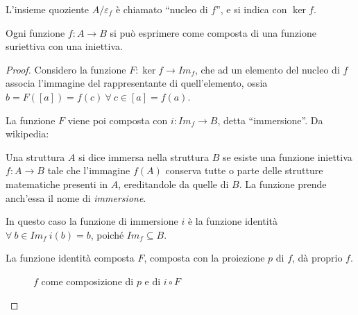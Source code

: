 \begin{defn}
L'insieme quoziente $A / \varepsilon_f$ \`e chiamato ``nucleo di $f$'', e si indica con $\ker f$.
\end{defn}

\begin{prop}
Ogni funzione $f : A \to B$ si pu\`o esprimere come composta di una funzione suriettiva con una iniettiva.
\end{prop}

\begin{proof}
Considero la funzione $F : \ker f \to Im_f$, che ad un elemento del nucleo di $f$ associa l'immagine del rappresentante di quell'elemento, ossia $b = F([a]) = f(c) \ \forall \ c \in [a] = f(a)$.

La funzione $F$ viene poi composta con $i : Im_f \to B $, detta ``immersione''. Da wikipedia:
\begin{defn}[Immersione]
Una struttura $A$  si dice immersa nella struttura $B$ se esiste una funzione iniettiva $f: A \to B$ tale che l'immagine $f(A)$ conserva tutte o parte delle strutture matematiche presenti in $A$, ereditandole da quelle di $B$. La funzione prende anch'essa il nome di \textit{immersione}.
\end{defn} 
In questo caso la funzione di immersione $i$ \`e la funzione identit\`a $ \forall \ b \in Im_f \ i(b) = b$, poich\'e $Im_f \subseteq B$.

La funzione identit\`a composta $F$, composta con la proiezione $p$ di $f$, d\`a proprio $f$.

\begin{figure}[ht]
\centering
{}
\caption{$f$ come composizione di $p$ e di $i \circ F$}
\end{figure}
\end{proof}

